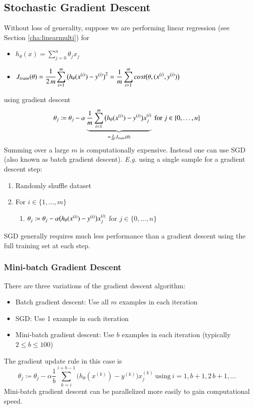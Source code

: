 \documentclass[a4paper,twoside,10pt]{article}
\begin{document}
\subsection{Stochastic Gradient Descent}
Without loss of generality, suppose we are performing linear regression (see Section \ref{cha:linearmulti}) for
\begin{itemize}
  \item $h_\theta(x)=\displaystyle\sum_{j=0}^n\theta_jx_j$
  \item $J_{train}(\theta)=\cfrac{1}{2\,m}\displaystyle\sum_{i=1}^m\big(h_\theta(x^{(i)})-y^{(i)}\big)^2=\frac{1}{m}\displaystyle\sum_{i=1}^m cost\big(\theta,(x^{(i)},y^{(i)})\big)$
\end{itemize}
using gradient descent
\begin{equation*}
  \theta_j\coloneqq\theta_j-\alpha\underbrace{\frac{1}{m}\displaystyle\sum_{i=1}^m\big(h_\theta(x^{(i)})-y^{(i)}\big)x^{(i)}_j}_{=\frac{\delta}{\delta\theta}J_{train}(\theta)}
  \mathrm{\ for\ }j\in\{0,\ldots,n\}
\end{equation*}
Summing over a large $m$ is computationally expensive.
Instead one can use \ac{SGD} (also known as batch gradient descent).
\emph{E.g.} using a single sample for a gradient descent step:
\begin{enumerate}
  \item Randomly shuffle dataset
  \item For $i\in\{1,\ldots,m\}$
    \begin{enumerate}
      \item $\theta_j\coloneqq\theta_j-\alpha\big(h_\theta(x^{(i)})-y^{(i)}\big)x^{(i)}_j$ for $j\in\{0,\ldots,n\}$
    \end{enumerate}
\end{enumerate}
\ac{SGD} generally requires much less performance than a gradient descent using the full training set at each step.

\subsubsection{Mini-batch Gradient Descent}
There are three variations of the gradient descent algorithm:
\begin{itemize}
  \item Batch gradient descent: Use all $m$ examples in each iteration
  \item \acf{SGD}: Use 1 example in each iteration
  \item Mini-batch gradient descent: Use $b$ examples in each iteration (typically $2\le b\le100$)
\end{itemize}
The gradient update rule in this case is
\begin{equation*}
  \theta_j\coloneqq\theta_j-\alpha\frac{1}{b}\sum_{k=i}^{i+b-1}\big(h_\theta(x^{(k)})-y^{(k)}\big)x^{(k)}_j
  \mathrm{\ using\ }i=1,b+1,2\,b+1,\ldots
\end{equation*}
Mini-batch gradient descent can be parallelized more easily to gain computational speed.
\end{document}

